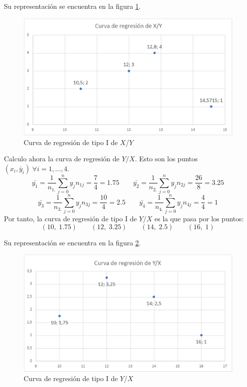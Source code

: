 \begin{ejercicio}
\begin{enumerate}
        Su representación se encuentra en la figura \ref{fig:Ej6.b.1}.
        \begin{figure}[H]
            \centering
            \includegraphics[width=0.6\linewidth]{Imagenes/Ej6.b.1.png}
            \caption{Curva de regresión de tipo I de $X$/$Y$}
            \label{fig:Ej6.b.1}
        \end{figure}

        Calculo ahora la curva de regresión de $Y/X$. Esto son los puntos $(x_i, \bar{y}_i)\;\forall i=1,\dots,4$.
        \begin{equation*}
            \bar{y_1} = \frac{1}{n_{1.}}\sum_{j=0}^n y_jn_{1j} = \frac{7}{4} = 1.75
            \qquad
            \bar{y_2} = \frac{1}{n_{2.}}\sum_{j=0}^n y_jn_{2j} = \frac{26}{8} = 3.25
        \end{equation*}
        \begin{equation*}
            \bar{y_3} = \frac{1}{n_{3.}}\sum_{j=0}^n y_jn_{3j} = \frac{10}{4} = 2.5
            \qquad
            \bar{y_4} = \frac{1}{n_{4.}}\sum_{j=0}^n y_jn_{4j} = \frac{4}{4} = 1
        \end{equation*}
        Por tanto, la curva de regresión de tipo I de $Y/X$ es la que pasa por los puntos:
        \begin{equation*}
            (10,\;1.75)\qquad (12,\;3.25) \qquad (14,\;2.5) \qquad (16,\;1)
        \end{equation*}
        
        Su representación se encuentra en la figura \ref{fig:Ej6.b.2}.
        \begin{figure}[H]
            \centering
            \includegraphics[width=0.6\linewidth]{Imagenes/Ej6.b.2.png}
            \caption{Curva de regresión de tipo I de $Y$/$X$}
            \label{fig:Ej6.b.2}
        \end{figure}


\end{enumerate}
\end{ejercicio}
